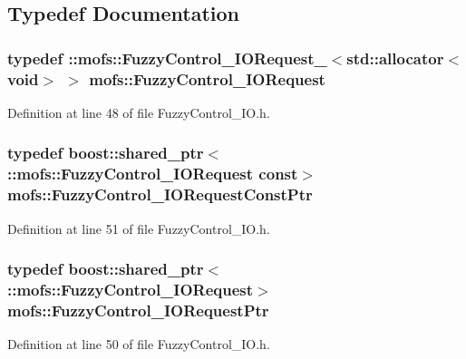 \subsection{Typedef Documentation}
\subsubsection[{Fuzzy\-Control\-\_\-\-I\-O\-Request}]{\setlength{\rightskip}{0pt plus 5cm}typedef \-::{\bf mofs\-::\-Fuzzy\-Control\-\_\-\-I\-O\-Request\-\_\-}$<$std\-::allocator$<$void$>$ $>$ {\bf mofs\-::\-Fuzzy\-Control\-\_\-\-I\-O\-Request}}\label{namespacemofs_aac68c8d340357937dcf461e586fc9104}


Definition at line 48 of file Fuzzy\-Control\-\_\-\-I\-O.\-h.

\subsubsection[{Fuzzy\-Control\-\_\-\-I\-O\-Request\-Const\-Ptr}]{\setlength{\rightskip}{0pt plus 5cm}typedef boost\-::shared\-\_\-ptr$<$ \-::{\bf mofs\-::\-Fuzzy\-Control\-\_\-\-I\-O\-Request} const$>$ {\bf mofs\-::\-Fuzzy\-Control\-\_\-\-I\-O\-Request\-Const\-Ptr}}\label{namespacemofs_a33e8265eb6ba8829d4b0e7e10a512cc0}


Definition at line 51 of file Fuzzy\-Control\-\_\-\-I\-O.\-h.

\subsubsection[{Fuzzy\-Control\-\_\-\-I\-O\-Request\-Ptr}]{\setlength{\rightskip}{0pt plus 5cm}typedef boost\-::shared\-\_\-ptr$<$ \-::{\bf mofs\-::\-Fuzzy\-Control\-\_\-\-I\-O\-Request}$>$ {\bf mofs\-::\-Fuzzy\-Control\-\_\-\-I\-O\-Request\-Ptr}}\label{namespacemofs_ab1471c132d99d2d57a4e68ff9a9b4063}


Definition at line 50 of file Fuzzy\-Control\-\_\-\-I\-O.\-h.

